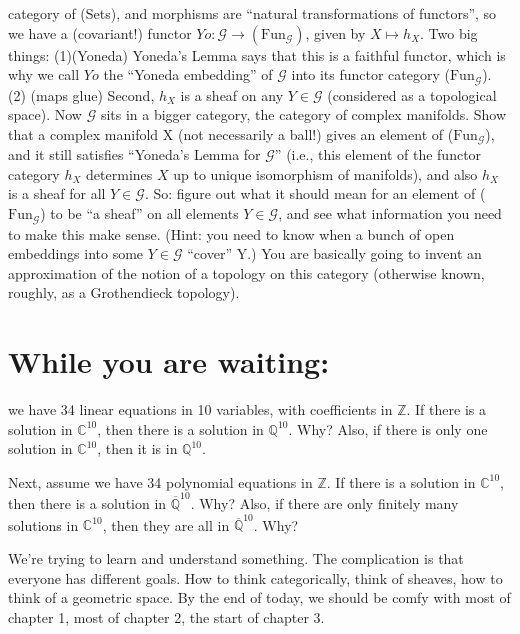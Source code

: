 \documentclass{book}
\theoremstyle{definition}
\begin{document}
\begin{itemize}
         category of (Sets), and morphisms are ``natural transformations of
         functors'', so we have a (covariant!) functor
         $Yo: \mathcal{G} \rightarrow (\text{Fun}_{\mathcal{G}} )$, given by $X \mapsto h_X$. Two
         big things:
         (1)(Yoneda) Yoneda’s Lemma says that this is a faithful functor, which is why
         we call $Yo$ the ``Yoneda embedding'' of $\mathcal{G}$ into its functor
         category ($\text{Fun}_{\mathcal{G}}$).
         (2) (maps glue) Second, $h_X$ is a sheaf on any $Y \in \mathcal{G}$ (considered as
         a topological space).  Now $\mathcal{G}$ sits in a bigger category, the
         category of complex manifolds.
         Show that a complex manifold X (not necessarily a ball!) gives an
         element of ($\text{Fun}_{\mathcal{G}}$), and it still satisfies ``Yoneda’s
         Lemma for $\mathcal{G}$'' (i.e., this element of the functor category
         $h_X$ determines $X$ up to unique isomorphism of manifolds), and also
         $h_X$ is a sheaf for all $Y \in \mathcal{G}$.
         So: figure out what it should mean for an element of
         ($\text{Fun}_{\mathcal{G}}$)
         to be ``a sheaf'' on all elements $Y \in \mathcal{G}$, and see what
         information you need to make this make sense. (Hint: you need to know
         when a bunch of open embeddings into some $Y \in \mathcal{G}$ ``cover'' Y.)
         You are basically going to invent an approximation of the notion of a
         topology on this category (otherwise known, roughly, as a Grothendieck
         topology).
\end{itemize}

\section{While you are waiting:}
we have 34 linear equations in 10 variables, with coefficients in $\mathbb Z$.
If there is a solution in $\mathbb C^{10}$, then there is a solution in $\mathbb Q^{10}$. Why?
Also, if there is only one solution in $\mathbb C^{10}$, then it is in $\mathbb Q^{10}$.

Next, assume we have 34 polynomial equations in $\mathbb Z$. If there is a solution
in $\mathbb C^10$, then there is a solution in $\overline{\mathbb Q}^{10}$. Why?
Also, if there are only finitely many solutions in $\mathbb C^{10}$, then they
are all in $\overline{\mathbb Q}^{10}$. Why? 

We're trying to learn and understand something. The complication is that
everyone has different goals. How to think categorically, think of sheaves,
how to think of a geometric space. By the end of today, we should be comfy
with most of chapter 1, most of chapter 2, the start of chapter 3.
\end{document}
